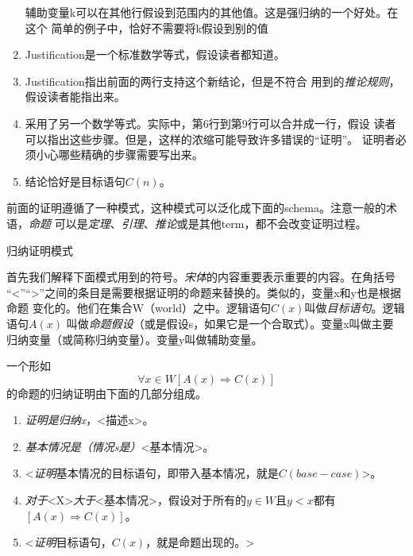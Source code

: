 \begin{proposition}
\begin{enumerate}
        辅助变量k可以在其他行假设到范围内的其他值。这是强归纳的一个好处。在这个
        简单的例子中，恰好不需要将k假设到别的值

\item Justification是一个标准数学等式，假设读者都知道。
\item Justification指出前面的两行支持这个新结论，但是不符合
        用到的\emph{推论规则}，假设读者能指出来。
\item 采用了另一个数学等式。实际中，第6行到第9行可以合并成一行，假设
        读者可以指出这些步骤。但是，这样的浓缩可能导致许多错误的“证明”。
        证明者必须小心哪些精确的步骤需要写出来。

\item 结论恰好是目标语句$C(n)$。

\end{enumerate}

\end{proposition}

前面的证明遵循了一种模式，这种模式可以泛化成下面的schema。注意一般的术语，\emph{命题}
可以是\emph{定理}、\emph{引理}、\emph{推论}或是其他term，都不会改变证明过程。

\begin{definition}\label{Def:InductionProofSchema}
归纳证明模式

首先我们解释下面模式用到的符号。\emph{宋体}的内容重要表示重要的内容。在角括号
“<”“>”之间的条目是需要根据证明的命题来替换的。类似的，变量x和y也是根据命题
变化的。他们在集合W（world）之中。逻辑语句$C(x)$叫做\emph{目标语句}。逻辑语句$A(x)$
叫做\emph{命题假设}（或是假设s，如果它是一个合取式）。变量x叫做主要
归纳变量（或简称归纳变量）。变量y叫做辅助变量。

一个形如
\begin{displaymath}
\forall x \in W[A(x) \Rightarrow C(x)]
\end{displaymath}
的命题的归纳证明由下面的几部分组成。
\begin{enumerate}
\item \emph{证明是归纳x}，<描述x>。
\item \emph{基本情况是（情况s是）}<基本情况>。
\item <\emph{证明}基本情况的目标语句，即带入基本情况，就是$C(base-case)$>。
\item \emph{对于}<X>\emph{大于}<基本情况>，假设对于所有的$y\in W$且$y<x$都有$[A(x)\Rightarrow C(x)]$。
\item <\emph{证明}目标语句，$C(x)$，就是命题出现的。>
\end{enumerate}
\end{definition}

